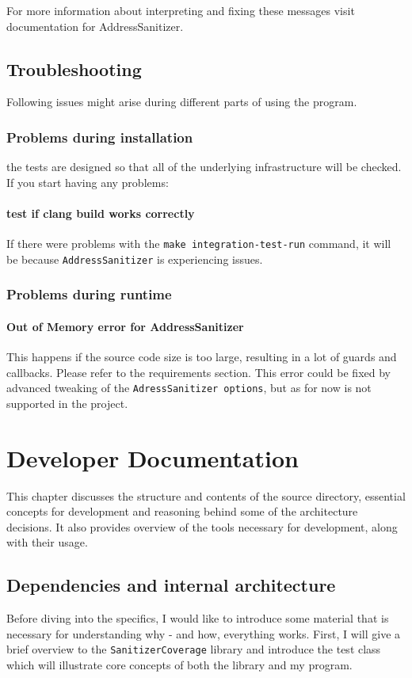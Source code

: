 \documentclass{elteikthesis}[2018/06/06]
\newcommand*{\code}{\lstinline[keywordstyle=\color{violet}, basicstyle=\color{violet}]}
\begin{document}
For more information about interpreting and fixing these messages visit documentation for AddressSanitizer\cite{addresssanitizer docs}. \\
\section{Troubleshooting}
\label{sec-2-5}
Following issues might arise during different parts of using the program. \\
\subsection{Problems during installation}
\label{sec-2-5-1}
the tests are designed so that all of the underlying infrastructure will be checked. If you start having any problems: \\
\subsubsection{test if clang build works correctly}
\label{sec-2-5-1-1}
If there were problems with the \code{make integration-test-run} command, it will be because \code{AddressSanitizer} is experiencing issues. \\
\subsection{Problems during runtime}
\label{sec-2-5-2}
\subsubsection{Out of Memory error for AddressSanitizer}
\label{sec-2-5-2-1}
This happens if the source code size is too large, resulting in a lot of guards and callbacks. Please refer to the requirements section. This error could be fixed by advanced tweaking of the \code{AdressSanitizer options}, but as for now is not supported in the project. \\
\chapter{Developer Documentation}
\label{sec-3}
This chapter discusses the structure and contents of the source directory, essential concepts for development and reasoning behind some of the architecture decisions. It also provides overview of the tools necessary for development, along with their usage. \\
\section{Dependencies and internal architecture}
\label{sec-3-1}
Before diving into the specifics, I would like to introduce some material that is necessary for understanding why - and how, everything works. First, I will give a brief overview to the \code{SanitizerCoverage} library and introduce the test class which will illustrate core concepts of both the library and my program. \\
\end{document}
